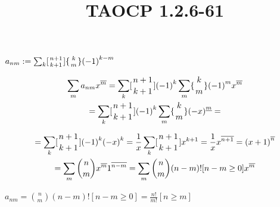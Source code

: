 \documentclass{article}
\title{TAOCP 1.2.6\mbox{-}61}
\begin{document}
\maketitle

\( a_{nm} := \sum_{k} [{{n+1} \atop {k+1}}] \{{k \atop m}\} {(-1)}^{k-m} \)

\begin{multline*}
\sum_{m} a_{nm} x^{\overline{m}} = \sum_{k} [{{n+1} \atop {k+1}}]{(-1)}^{k} \sum_{m} \{{k \atop m}\} {(-1)}^{m} x^{\overline{m}} \\
= \sum_{k} [{{n+1} \atop {k+1}}]{(-1)}^{k} \sum_{m} \{{k \atop m}\} {(-x)}^{\underline{m}} =
\end{multline*}

\begin{multline*}
= \sum_{k} [{{n+1} \atop {k+1}}]{(-1)}^{k} {(-x)}^{k} = \frac{1}{x} \sum_{k} [{{n+1} \atop {k+1}}]x^{k+1} = \frac{1}{x} x^{\overline{n+1}} = {(x+1)}^{\overline{n}} \\
= \sum_{m} \binom{n}{m} x^{\overline{m}}1^{\overline{n-m}} = \sum_{m} \binom{n}{m}(n-m)![n-m \geq 0] x^{\overline{m}}
\end{multline*}

\( a_{nm} = \binom{n}{m}(n-m)![n-m \geq 0] = \frac{n!}{m!} [n \geq m] \)
\end{document}
